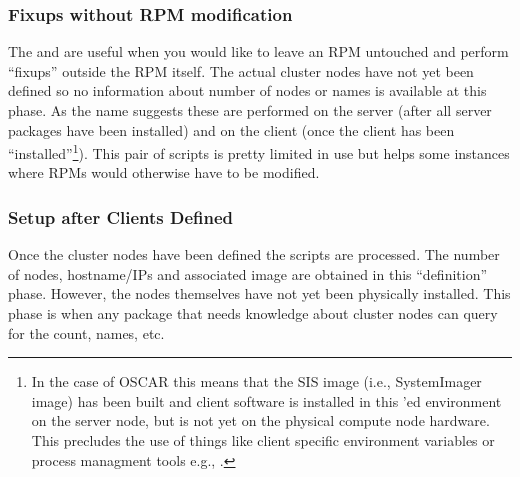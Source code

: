 \subsubsection{Fixups without RPM modification}

The  and 
are useful when you would like to leave an RPM untouched and perform
``fixups'' outside the RPM itself.  The actual cluster nodes have not yet
been defined so no information about number of nodes or names is available
at this phase.  As the name suggests these are performed on the server
(after all server packages have been installed) and on the client (once the
client has been ``installed''\footnote{In the case of OSCAR this means that
the SIS image (i.e., SystemImager image) has been built and client software
is installed in this 'ed environment on the server node, but is
not yet on the physical compute node hardware.  This precludes the use of
things like client specific environment variables or process managment
tools e.g., .}).  This pair of scripts is pretty limited in
use but helps some instances where RPMs would otherwise have to be
modified.



\subsubsection{Setup after Clients Defined}

Once the cluster nodes have been defined the  scripts
are processed.  The number of nodes, hostname/IPs and associated image are
obtained in this ``definition'' phase.  However, the nodes themselves have
not yet been physically installed.  This  phase is when
any package that needs knowledge about cluster nodes can query for the
count, names, etc.  


